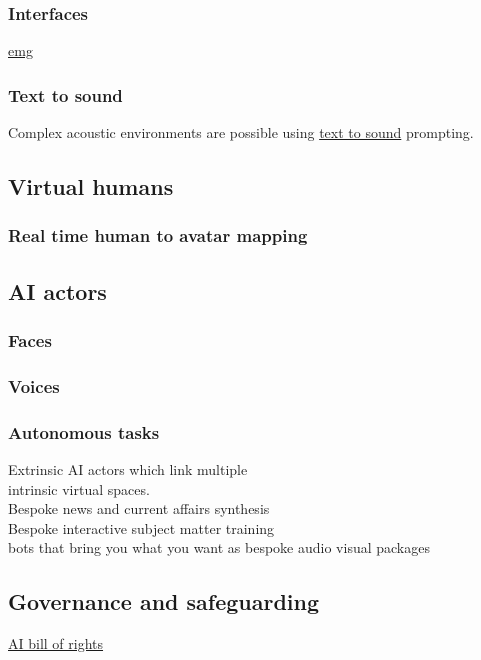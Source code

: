 \subsubsection{Interfaces}
\href{https://tech.fb.com/ar-vr/2021/03/inside-facebook-reality-labs-wrist-based-interaction-for-the-next-computing-platform/}{emg}
\subsubsection{Text to sound}
Complex acoustic environments are possible using \href{https://anonymous.4open.science/w/iclr2023_samples-CB68/report.html}{text to sound} prompting. 
\subsection{Virtual humans}
\subsubsection{Real time human to avatar mapping}
\subsection{AI actors}
\subsubsection{Faces}
\subsubsection{Voices}
\subsubsection{Autonomous tasks}

Extrinsic AI actors which link multiple\\ intrinsic virtual spaces.\\
Bespoke news and current affairs synthesis\\
Bespoke interactive subject matter training\\
bots that bring you what you want as bespoke audio visual packages
\subsection{Governance and safeguarding}


\href{https://www.whitehouse.gov/ostp/ai-bill-of-rights/}{AI bill of rights}

